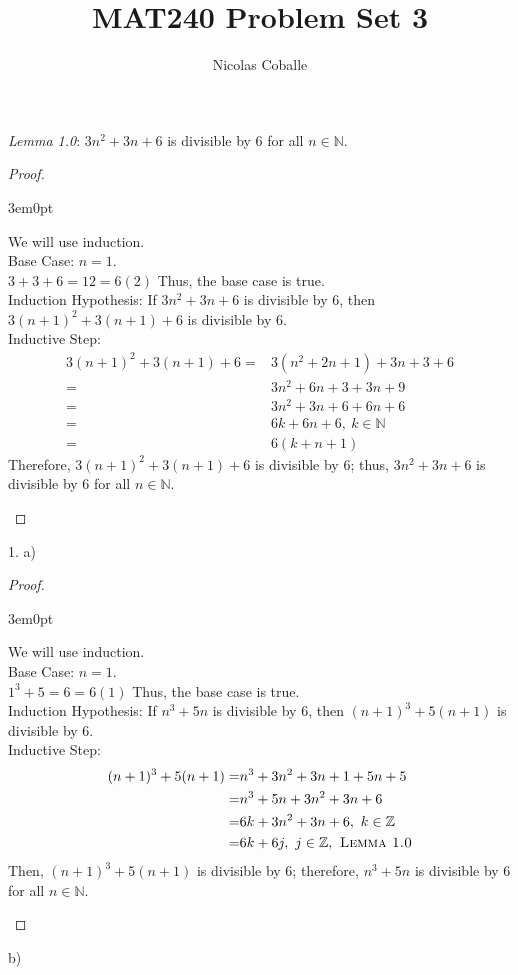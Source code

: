 \documentclass[11pt]{article}
\title{MAT240 Problem Set 3}
\author{Nicolas Coballe}
\newcommand{\bproof}{\begin{proof}
$ $ \\
\begin{adjustwidth}{3em}{0pt}
}
\newcommand{\eproof}{\end{adjustwidth}
\end{proof}}
\newcommand{\N}{\mathbb{N}}
\newcommand{\Z}{\mathbb{Z}}
\begin{document}
\maketitle
\begin{flushleft}

\textsl{Lemma 1.0}: $3n^2 + 3n + 6$ is divisible by 6 for all $n \in \N$. \\

\bproof

We will use induction. \\
\bigskip
Base Case: $n = 1$. \\
$3+3+6 = 12 = 6(2)$ Thus, the base case is true. \\
Induction Hypothesis: If $3n^2 + 3n + 6$ is divisible by 6, then $3(n+1)^2 + 3(n+1) + 6$ is divisible by 6. \\
Inductive Step:
\begin{align*}
3(n+1)^2 + 3(n+1) + 6 = & 3(n^2 + 2n + 1) + 3n + 3 + 6 \\
= & 3n^2 + 6n + 3 + 3n + 9 \\
= & 3n^2 + 3n + 6 + 6n + 6 \\
= & 6k + 6n + 6, \ k \in \N \\
= & 6(k + n + 1)
\end{align*}
Therefore, $3(n+1)^2 + 3(n+1) + 6$ is divisible by 6; thus, $3n^2 + 3n + 6$ is divisible by 6 for all $n \in \N$.

\eproof

1. a)

\bproof

We will use induction. \\
\bigskip
Base Case: $n = 1$. \\
$1^3 + 5 = 6 = 6(1)$ Thus, the base case is true. \\
Induction Hypothesis: If $n^3 + 5n$ is divisible by 6, then $(n+1)^3 + 5(n+1)$ is divisible by 6. \\
Inductive Step:
\begin{align*}
(n+1)^3 + 5(n+1) = & n^3 + 3n^2 + 3n + 1 + 5n + 5 \\
= & n^3 + 5n + 3n^2 + 3n + 6 \\
= & 6k + 3n^2 + 3n + 6, \ k \in \Z \\
= & 6k + 6j, \ j \in \Z, \textsc{ Lemma 1.0}
\end{align*}
Then, $(n+1)^3 + 5(n+1)$ is divisible by 6; therefore, $n^3 + 5n$ is divisible by 6 for all $n \in \N$.

\eproof

b)


\end{flushleft}
\end{document}
